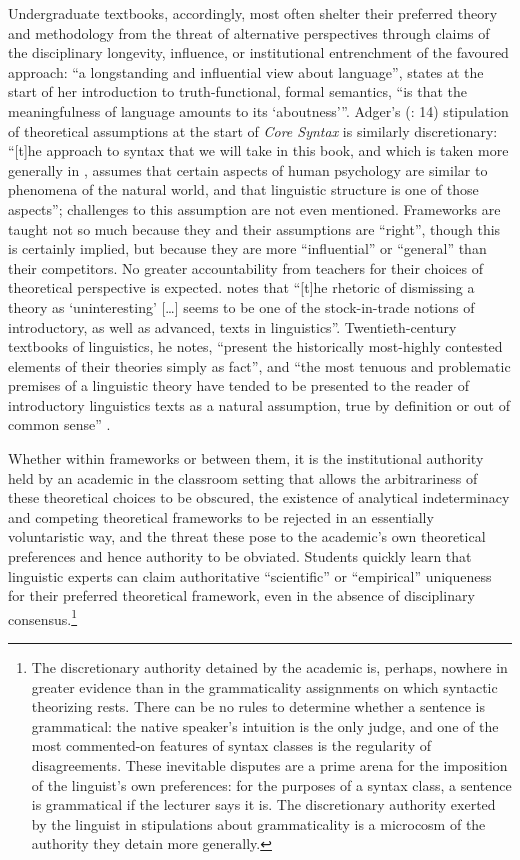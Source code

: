 \documentclass[output=paper]{langscibook}
\begin{document}
Undergraduate textbooks, accordingly, most often shelter their preferred theory and methodology from the threat of alternative perspectives through claims of the disciplinary longevity, influence, or institutional entrenchment of the favoured approach: ``a longstanding and influential view about language'', states \citet[6]{Kearns2008} at the start of her introduction to truth-functional, formal semantics, ``is that the meaningfulness of language amounts to its `aboutness'\thinspace''. Adger's (\citeyear{Adger2003}: 14) stipulation of theoretical assumptions at the start of \emph{Core Syntax} is similarly discretionary: ``[t]he approach to syntax that we will take in this book, and which is taken more generally in , assumes that certain aspects of human psychology are similar to phenomena of the natural world, and that linguistic structure is one of those aspects''; challenges to this assumption are not even mentioned. Frameworks are taught not so much because they and their assumptions are ``right'', though this is certainly implied, but because they are more ``influential'' or ``general'' than their competitors. No greater accountability from teachers for their choices of theoretical perspective is expected. \citet[9]{Lawson2001} notes that ``[t]he rhetoric of dismissing a theory as `uninteresting' […] seems to be one of the stock-in-trade notions of introductory, as well as advanced, texts in linguistics''. Twentieth-century textbooks of linguistics, he notes, ``present the historically most-highly contested elements of their theories simply as fact'', and ``the most tenuous and problematic premises of a linguistic theory have tended to be presented to the reader of introductory linguistics texts as a natural assumption, true by definition or out of common sense'' \citep[12]{Lawson2001}.

Whether within frameworks or between them, it is the institutional authority held by an academic in the classroom setting that allows the arbitrariness of these theoretical choices to be obscured, the existence of analytical indeterminacy and competing theoretical frameworks to be rejected in an essentially voluntaristic way, and the threat these pose to the academic's own theoretical preferences and hence authority to be obviated. Students quickly learn that linguistic experts can claim authoritative ``scientific'' or ``empirical'' uniqueness for their preferred theoretical framework, even in the absence of disciplinary consensus.\footnote{The discretionary authority detained by the academic is, perhaps, nowhere in greater evidence than in the grammaticality assignments on which syntactic theorizing rests. There can be no rules to determine whether a sentence is grammatical: the native speaker's intuition is the only judge, and one of the most commented-on features of syntax classes is the regularity of disagreements. These inevitable disputes are a prime arena for the imposition of the linguist's own preferences: for the purposes of a syntax class, a sentence is grammatical if the lecturer says it is. The discretionary authority exerted by the linguist in stipulations about grammaticality is a microcosm of the authority they detain more generally.}
\end{document}
